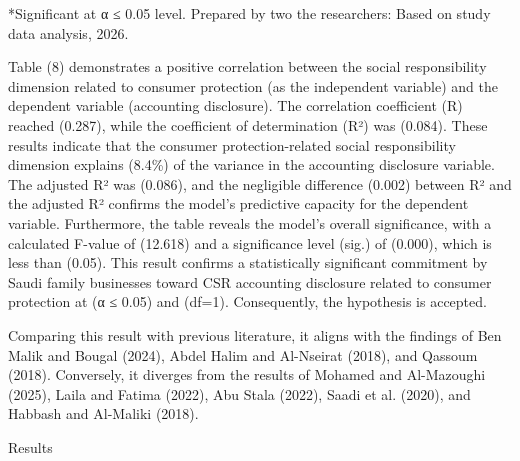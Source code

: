 \documentclass{default}
\begin{document}
*Significant at α ≤ 0.05 level. Prepared by two the researchers: Based on study data analysis, 2026.

Table (8) demonstrates a positive correlation between the social responsibility dimension related to consumer protection (as the independent variable) and the dependent variable (accounting disclosure). The correlation coefficient (R) reached (0.287), while the coefficient of determination (R²) was (0.084). These results indicate that the consumer protection-related social responsibility dimension explains (8.4\%) of the variance in the accounting disclosure variable. The adjusted R² was (0.086), and the negligible difference (0.002) between R² and the adjusted R² confirms the model’s predictive capacity for the dependent variable. Furthermore, the table reveals the model's overall significance, with a calculated F-value of (12.618) and a significance level (sig.) of (0.000), which is less than (0.05). This result confirms a statistically significant commitment by Saudi family businesses toward CSR accounting disclosure related to consumer protection at (α ≤ 0.05) and (df=1). Consequently, the hypothesis is accepted.

Comparing this result with previous literature, it aligns with the findings of Ben Malik and Bougal (2024), Abdel Halim and Al-Nseirat (2018), and Qassoum (2018). Conversely, it diverges from the results of Mohamed and Al-Mazoughi (2025), Laila and Fatima (2022), Abu Stala (2022), Saadi et al. (2020), and Habbash and Al-Maliki (2018).

Results
\end{document}
